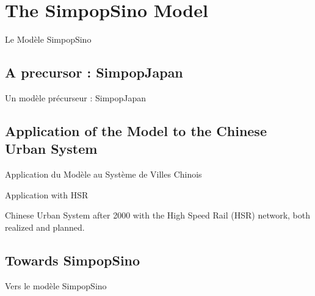 





\section[The SimpopSino Model][Le Modèle SimpopSino]{The SimpopSino Model}{Le Modèle SimpopSino}


\label{sec:simpopsino}


\subsection{A precursor : SimpopJapan}{Un modèle précurseur : SimpopJapan}















\subsection{Application of the Model to the Chinese Urban System}{Application du Modèle au Système de Villes Chinois}


Application with HSR

Chinese Urban System after 2000 with the High Speed Rail (HSR) network, both realized and planned.








\subsection{Towards SimpopSino}{Vers le modèle SimpopSino}








